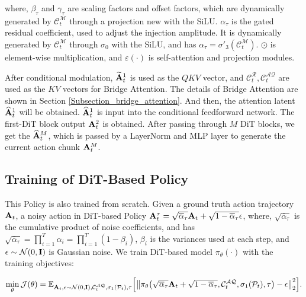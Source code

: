 \noindent where, ${\beta_\tau}$ and ${\gamma_\tau}$ are scaling factors and offset factors, which are dynamically generated by $\mathcal{C}_t^\mathcal{M}$ through a projection new with the SiLU. ${\alpha_\tau}$ is the gated residual coefficient, used to adjust the injection amplitude. It is dynamically generated by $\mathcal{C}_t^\mathcal{M}$ through ${\sigma_0}$ with the SiLU, and has ${\alpha _\tau} = {\sigma' _3}(\mathcal{C}_t^\mathcal{M})$. $\odot$ is element-wise multiplication, and $\varepsilon(\cdot)$ is self-attention and projection modules.

After conditional modulation, $\widetilde {\bf{A}}_t^1$ is used as the $QKV$ vector, and $\mathcal{C}_t^\mathcal{R},\mathcal{C}_t^\mathcal{AQ}$ are used as the $KV$ vectors for Bridge Attention. The details of Bridge Attention are shown in Section \ref{Subsection_bridge_attention}. And then, the attention latent $\widehat{\bf{A}}^1_t$ will be obtained. $\widehat{\bf{A}}^1_t$ is input into the conditional feedforward network. The first-DiT block output ${\bf A}^2_t$ is obtained. After passing through $M$ DiT blocks, we get the $\widehat{\bf A}^{M}_t$, which is passed by a LayerNorm and MLP layer to generate the current action chunk ${\bf A}^M_t$.

\subsection{Training of DiT-Based Policy}\label{Appendix_DiT_2}
This Policy is also trained from scratch. Given a ground truth action trajectory ${{\bf{A}}_t}$, a noisy action in DiT-based Policy ${\bf{A}}_t^{\tau} = \sqrt {{{\overline \alpha  }_{\tau} }} {{\bf{A}}_{\rm{t}}} + \sqrt {1 - {{\overline \alpha  }_{\tau} }} \epsilon$, where, $\sqrt {{{\overline \alpha  }_{\tau} }} $ is the cumulative product of noise coefficients, and has $\sqrt {{{\overline \alpha  }_{\tau} }}  = \prod\nolimits_{i = 1}^T {{\alpha _i}}  = \prod\nolimits_{i = 1}^T {(1 - {\beta _i})} $, $\beta_i$ is the variances used at each step, and $\epsilon \sim \mathcal{N}(0,{\bf{I}})$ is Gaussian noise. We train DiT-based model $\pi_\theta ( \cdot )$ with the training objectives:

\begin{equation}
\mathop {\min }\limits_\theta \mathcal{J}(\theta ) = {\mathbb{E}_{{{\bf{A}}_t},\epsilon \sim \mathcal{N}(0,{\bf{I}}),\mathcal{{\cal C}}_t^\mathcal{AQ},{\sigma _1}({\mathcal{P}_t}),\tau}}\Big[\big\|{\pi _\theta } \big(\sqrt {{{\overline \alpha  }_{\tau} }} {{\bf{A}}_t}+ \sqrt {1 - {{\overline \alpha  }_{\tau} }} \mathcal{},\mathcal{C}_t^\mathcal{AQ},{\sigma _1}({\mathcal{P}_t}),\tau\big) - \epsilon\big\|_2^2\Big].
\end{equation}

